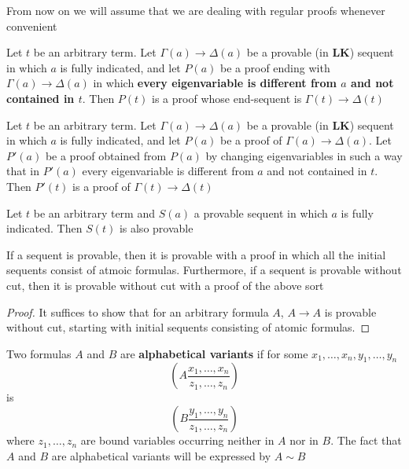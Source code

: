 \documentclass[11pt]{article}
\def \LK {\textbf{LK}}
\begin{document}
From now on we will assume that we are dealing with regular proofs whenever
convenient

\begin{lemma}[]
\label{lemma2.11}
Let \(t\) be an arbitrary term. Let \(\Gamma(a)\to \Delta(a)\) be a provable (in \(\LK\))
sequent in which \(a\) is fully indicated, and let \(P(a)\) be a proof ending
with \(\Gamma(a)\to \Delta(a)\) in which \textbf{every eigenvariable is different from \(a\) and
not contained in \(t\)}. Then \(P(t)\) is a proof whose end-sequent is
\(\Gamma(t)\to \Delta(t)\)
\end{lemma}

\begin{lemma}[]
Let \(t\) be an arbitrary term. Let \(\Gamma(a)\to \Delta(a)\) be a provable (in \(\LK\))
sequent in which \(a\) is fully indicated, and let \(P(a)\) be a proof of
\(\Gamma(a)\to \Delta(a)\). Let \(P'(a)\) be a proof obtained from \(P(a)\) by changing
eigenvariables in such a way that in \(P'(a)\) every eigenvariable is
different from \(a\) and not contained in \(t\). Then \(P'(t)\) is a proof of
\(\Gamma(t)\to \Delta(t)\)
\end{lemma}

\begin{proposition}[]
Let \(t\) be an arbitrary term and \(S(a)\) a provable sequent in which \(a\)
is fully indicated. Then \(S(t)\) is also provable
\end{proposition}

\begin{proposition}[]
\label{prop2.14}
If a sequent is provable, then it is provable with a proof in which all the
initial sequents consist of atmoic formulas. Furthermore, if a sequent is
provable without cut, then it is provable without cut with a proof of the
above sort
\end{proposition}

\begin{proof}
It suffices to show that for an arbitrary formula \(A\), \(A\to A\) is
provable without cut, starting with initial sequents consisting of atomic formulas.
\end{proof}

\begin{definition}[]
Two formulas \(A\) and \(B\) are \textbf{alphabetical variants} if for some
\(x_1,\dots,x_n,y_1,\dots,y_n\)
\begin{equation*}
\left(A\frac{x_1,\dots,x_n}{z_1,\dots,z_n}
\right)
\end{equation*}
is
\begin{equation*}
\left(
B\frac{y_1,\dots,y_n}{z_1,\dots,z_n}
\right)
\end{equation*}
where \(z_1,\dots,z_n\) are bound variables occurring neither in \(A\) nor in
\(B\). The fact that \(A\) and \(B\) are alphabetical variants will be
expressed by \(A\sim B\)
\end{definition}
\end{document}

